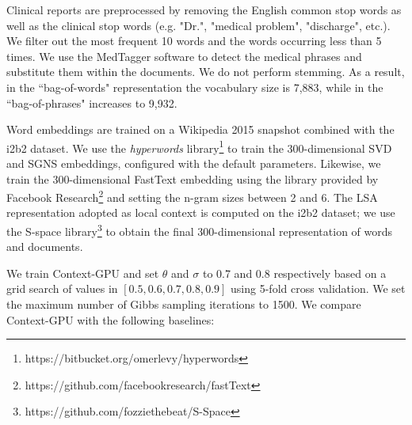 \documentclass[letterpaper]{article}
\begin{document}
Clinical reports are preprocessed by removing the English common stop words as well as the clinical stop words (e.g. "Dr.", "medical problem", "discharge", etc.). We filter out the most frequent 10 words and the words occurring less than 5 times. We use the MedTagger software to detect the medical phrases and substitute them within the documents. We do not perform stemming. As a result, in the ``bag-of-words" representation the vocabulary size is 7,883, while in the ``bag-of-phrases" increases to 9,932.

Word embeddings are trained on a Wikipedia 2015 snapshot combined with the i2b2 dataset. We use the \textit{hyperwords} library\footnote{https://bitbucket.org/omerlevy/hyperwords} \cite{Levy15} to train the 300-dimensional SVD and SGNS embeddings, configured with the default parameters. Likewise, we train the 300-dimensional FastText embedding using the library provided by Facebook Research\footnote{https://github.com/facebookresearch/fastText} and setting the n-gram sizes between 2 and 6.
The LSA representation adopted as local context is computed on the i2b2 dataset; we use the S-space library\footnote{https://github.com/fozziethebeat/S-Space} to obtain the final 300-dimensional representation of words and documents.

We train Context-GPU and set $\theta$ and $\sigma$ to 0.7 and 0.8 respectively based on a grid search of values in $[0.5, 0.6, 0.7, 0.8, 0.9]$ using 5-fold cross validation.  %
We set the maximum number of Gibbs sampling iterations to 1500. %
We compare Context-GPU with the following baselines:
\end{document}
